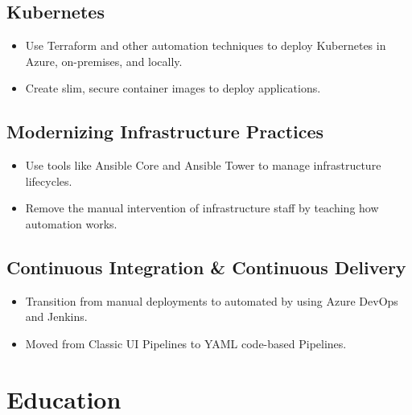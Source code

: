 \documentclass{article}
\begin{document}
    \subsection{Kubernetes}

      \begin{scriptsize}
        \begin{itemize}
          \item Use Terraform and other automation techniques to deploy Kubernetes in Azure, on-premises, and locally.
          \item Create slim, secure container images to deploy applications.
        \end{itemize}
      \end{scriptsize}

    \subsection{Modernizing Infrastructure Practices}

      \begin{scriptsize}
        \begin{itemize}
          \item Use tools like Ansible Core and Ansible Tower to manage infrastructure lifecycles.
          \item Remove the manual intervention of infrastructure staff by teaching how automation works.
        \end{itemize}
      \end{scriptsize}

    \subsection{Continuous Integration \& Continuous Delivery}

      \begin{scriptsize}
        \begin{itemize}
          \item Transition from manual deployments to automated by using Azure DevOps and Jenkins.
          \item Moved from Classic UI Pipelines to YAML code-based Pipelines.
        \end{itemize}
      \end{scriptsize}

  \section{Education}
\end{document}

